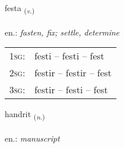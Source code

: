 \documentclass[frontgrid, backgrid]{flacards}\usepackage[]{graphicx}\usepackage[]{xcolor}
\begin{document}
\renewcommand{\flhead}{\vskip5pt \fboxsep=0pt {\small\bfseries\footnotesize Sagnorð | Verb}}
\renewcommand{\fcfoot}{\vskip5pt \fboxsep=0pt \hspace{2pt}{\small\bfseries\footnotesize 2K}}

\renewcommand{\blhead}{\vskip5pt {\small\bfseries\footnotesize Sagnorð | Verb }}
\renewcommand{\bcfoot}{\vskip5pt \hspace{2pt}{\small\bfseries\footnotesize 2K}}


{festa \small{\textsubscript{(\textit{v.})}} \\[1ex] %
\textphonetic{[fɛsta]} \\
en.: \emph{fasten, fix; settle, determine} \\  [2ex]
\renewcommand*{\arraystretch}{0.8}
\begin{tabular}{p{1cm}l}
\textsc{1sg}: & festi -- festi -- fest \\ 
\textsc{2sg}: & festir -- festir -- fest \\ 
\textsc{3sg}: & festir -- festi -- fest \\ 
\end{tabular}
}

\renewcommand{\flhead}{\vskip5pt \fboxsep=0pt {\small\bfseries\footnotesize Nafnorð | Noun}}
\renewcommand{\fcfoot}{\vskip5pt \fboxsep=0pt \hspace{2pt}{\small\bfseries\footnotesize 2K}}

\renewcommand{\blhead}{\vskip5pt {\small\bfseries\footnotesize Nafnorð | Noun }}
\renewcommand{\bcfoot}{\vskip5pt \hspace{2pt}{\small\bfseries\footnotesize 2K}}


{handrit \small{\textsubscript{(\textit{n.})}} \\[1ex] %
\textphonetic{[hantrɪt]} \\
en.: \emph{manuscript} \\  [2ex]
\renewcommand*{\arraystretch}{0.8}
}
\end{document}
